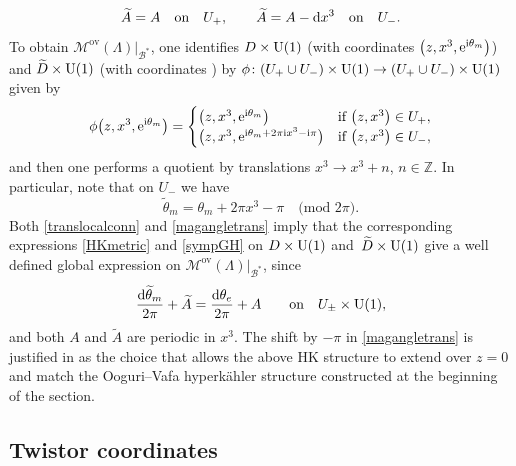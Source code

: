 \begin{equation}\label{translocalconn}
 \widetilde{A}=A \quad \text{on}\quad U_{+}, \qquad \widetilde{A}=A -{\rm d}x^3 \quad \text{on}\quad U_{-}.
\end{equation}
To obtain $\mathcal{M}^{\text{ov}}(\Lambda)|_{\mathcal{B}^*}$, one identifies $D\times {\rm U}(1)$ \big(with coordinates $\bigl(z,x^3,{\rm e}^{{\rm i}\theta_m}\bigr)$\big) and $\widetilde{D}\times {\rm U}(1)$ \big(with coordinates \big) by $\phi\colon (U_{+}\cup U_{-})\times {\rm U}(1)\to (U_{+}\cup U_{-})\times {\rm U}(1)$ given by
\begin{equation*}
 \phi\bigl(z,x^3,{\rm e}^{{\rm i}\theta_m}\bigr)=\begin{cases}
 \bigl(z,x^3,{\rm e}^{{\rm i}\theta_m}\bigr) & \text{if} \ \bigl(z,x^3\bigr) \in U_{+},\\
 \bigl(z,x^3,{\rm e}^{{\rm i}\theta_m+2\pi {\rm i}x^3 -\mathrm{i\pi}}\bigr) & \text{if} \ \bigl(z,x^3\bigr)\in U_{-},
 \end{cases}
\end{equation*}
and then one performs a quotient by translations $x^3\to x^3+n$, $n\in \mathbb{Z}$. In particular, note that on $U_{-}$ we have
\begin{equation}\label{magangletrans}
 \widetilde{\theta}_m=\theta_m+2\pi x^3 -\pi \quad \text{(mod $2\pi$)}.
\end{equation}
Both \eqref{translocalconn} and \eqref{magangletrans} imply that the corresponding expressions \eqref{HKmetric} and \eqref{sympGH} on $D\times {\rm U}(1)$ and~${\widetilde{D}\times {\rm U}(1)}$ give a well defined global expression on $\mathcal{M}^{\text{ov}}(\Lambda)|_{\mathcal{B}^*}$, since
\begin{equation*}
\frac{{\rm d}\widetilde{\theta}_m}{2\pi}+\widetilde{A}=\frac{{\rm d}\theta_e}{2\pi}+A \qquad \text{on}\quad U_{\pm}\times {\rm U}(1),
\end{equation*}
and both $A$ and $\widetilde{A}$ are periodic in $x^3$. The shift by $-\pi$ in \eqref{magangletrans} is justified in \cite[Section 4.1]{GMN1} as the choice that allows the above HK structure to extend over $z=0$ and match the Ooguri--Vafa hyperk\"ahler structure constructed at the beginning of the section.




\subsection{Twistor coordinates}


